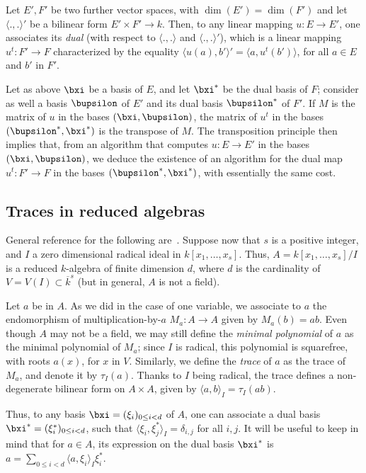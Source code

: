 \documentclass{sig-alternate}
\newcounter{algo}
\newcommand{\ang}[1]{\langle#1\rangle}
\begin{document}
Let $E',F'$ be two further vector spaces, with $\dim(E')=\dim(F')$ and
let $\ang{.,.}'$ be a bilinear form $E'\times F' \to k$. Then, to
any linear mapping $u:E\to E'$, one associates its {\em dual}
(with respect to $\ang{.,.}$ and $\ang{.,.}'$), which is a linear
mapping $u^t: F' \to F$ characterized by the equality
$\ang{u(a),b'}'=\ang{a,u^t(b')}$, for all $a\in E$ and $b'$ in $F'$.

Let as above $\bxi$ be a basis of $E$, and let $\bxi^\ast$ be
the dual basis of $F$; consider as well a basis $\bupsilon$ of $E'$ and
its dual basis $\bupsilon^\ast$ of $F'$. If $M$ is the matrix of $u$ in
the bases $(\bxi,\bupsilon)$, the matrix of $u^t$ in the bases
$(\bupsilon^\ast,\bxi^\ast)$ is the transpose of $M$. The
transposition principle then implies that, from an algorithm that
computes $u: E \to E'$ in the bases $(\bxi,\bupsilon)$, we deduce the
existence of an algorithm for the dual map $u^t: F' \to F$ in the
bases $(\bupsilon^\ast,\bxi^\ast)$, with essentially the same cost.


\subsection{Traces in reduced algebras}

General reference for the following
are~\cite{Kunz86,Cox-Little-OShea:UAG2005}. Suppose now that $s$ is a
positive integer, and $I$ a zero dimensional radical ideal in
$k[x_1,\dots,x_s]$. Thus, $A=k[x_1,\dots,x_s]/I$ is a reduced
$k$-algebra of finite dimension $d$, where $d$ is the cardinality of
$V=V(I) \subset\overline{k}^s$ (but in general, $A$ is not a field).

Let $a$ be in $A$. As we did in the case of one variable, we associate
to $a$ the endomorphism of multiplication-by-$a$ $M_a: A \to A$ given
by $M_a(b)=ab$.  Even though $A$ may not be a field, we may still
define the {\em minimal polynomial} of $a$ as the minimal polynomial
of $M_a$; since $I$ is radical, this polynomial is squarefree, with
roots $a(x)$, for $x$ in $V$. Similarly, we define the \emph{trace} of
$a$ as the trace of $M_a$, and denote it by $\tau_I(a)$. Thanks to $I$
being radical, the trace defines a non-degenerate bilinear form on
$A\times A$, given by $\ang{a,b}_I = \tau_I(ab)$.

Thus, to any basis $\bxi=(\xi_i)_{0 \le i < d}$ of $A$, one can
associate a dual basis $\bxi^\ast=(\xi^\ast_i)_{0 \le i < d}$,
such that $\ang{\xi_i, \xi^\ast_j}_I=\delta_{i,j}$ for all
$i,j$.  It will be useful to keep in mind that for $a \in A$, its
expression on the dual basis $\bxi^\ast$ is $a=\sum_{0 \le i < d}
\ang{a,\xi_i}_I \xi^\ast_i$.
\end{document}
